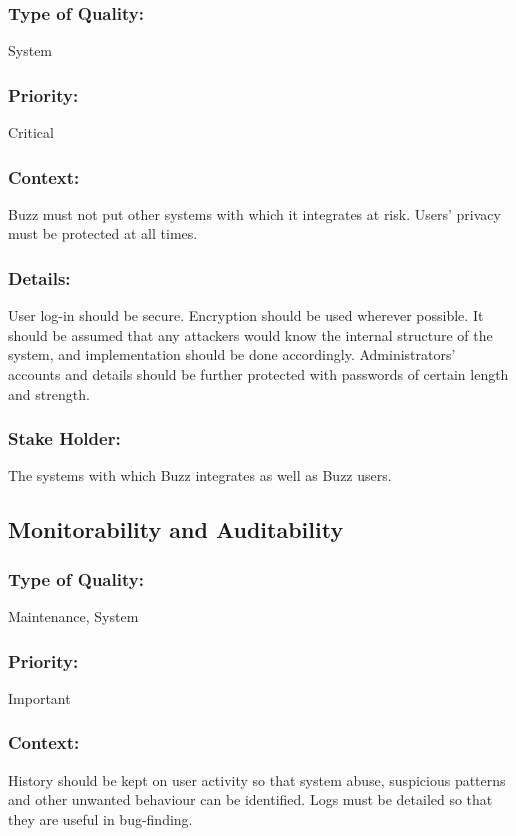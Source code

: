 \documentclass[11pt]{article}
\begin{document}
		\subsubsection{Type of Quality:}
			\textbf{}System
		
		\subsubsection{Priority:}
			\textbf{}Critical

		\subsubsection{Context:}
			\textbf{}Buzz must not put other systems with which it integrates at risk. Users’ privacy must be protected at all times. 
		
		\subsubsection{Details:}
			\textbf{}User log-in should be secure. Encryption should be used wherever possible. It should be assumed that any attackers would know the internal structure of the system, and implementation should be done accordingly. Administrators’ accounts and details should be further protected with passwords of certain length and strength.
		
		\subsubsection{Stake Holder:}
			\textbf{}The systems with which Buzz integrates as well as Buzz users.

	\subsection{Monitorability and Auditability}
		\subsubsection{Type of Quality:}
			\textbf{}Maintenance, System
		
		\subsubsection{Priority:}
			\textbf{}Important

		\subsubsection{Context:}
			\textbf{}History should be kept on user activity so that system abuse, suspicious patterns and other unwanted behaviour can be identified. Logs must be detailed so that they are useful in bug-finding.
		
\end{document}
